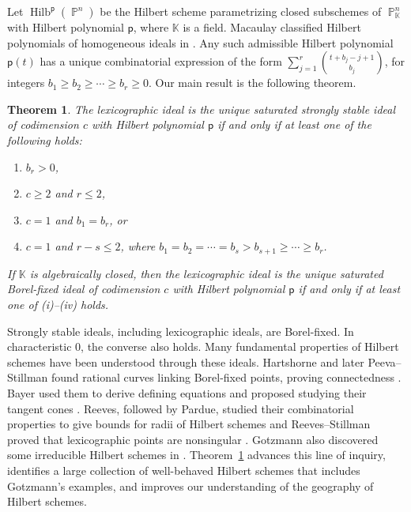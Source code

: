 \documentclass[12pt]{amsart}%
\newtheorem{theorem}{Theorem}[section]
\theoremstyle{definition}%
\DeclareMathOperator{\hilb}{Hilb}%
\DeclareMathOperator{\PP}{\mathbb{P}}%
\newcommand{\hp}{\mathsf{p}}%
\newcommand{\kk}{\mathbb{K}}%
\begin{document}
Let $\hilb^{\hp}(\PP^n)$ be the Hilbert scheme parametrizing closed
subschemes of $\PP^n_{\kk}$ with Hilbert polynomial $\hp$, where $\kk$
is a field.  Macaulay classified Hilbert polynomials of homogeneous
ideals in \cite{Macaulay--1927}.  Any such admissible Hilbert
polynomial $\hp(t)$ has a unique combinatorial expression of the form
$\sum_{j=1}^r \binom{t+b_j-j+1}{b_j}$, for integers $b_1 \ge b_2 \ge
\dotsb \ge b_r \ge 0$.  Our main result is the following theorem.

\begin{theorem}
  \label{thm:SSSunique2intro}
  The lexicographic ideal is the unique saturated strongly stable
  ideal of codimension $c$ with Hilbert polynomial $\hp$ if and only
  if at least one of the following holds:
  \begin{enumerate}
  \item $b_r > 0$,
  \item $c \ge 2$ and $r \le 2$,
  \item $c = 1$ and $b_1 = b_r$, or
  \item $c = 1$ and $r - s \le 2$, where $b_1 = b_2 = \dotsb = b_{s} >
    b_{s+1} \ge \dotsb \ge b_r$.
  \end{enumerate}
  If $\kk$ is algebraically closed, then the lexicographic ideal is
  the unique saturated Borel-fixed ideal of codimension $c$ with
  Hilbert polynomial $\hp$ if and only if at least one of (i)--(iv)
  holds.
\end{theorem}

Strongly stable ideals, including lexicographic ideals, are
Borel-fixed.  In characteristic $0$, the converse also holds.  Many
fundamental properties of Hilbert schemes have been understood through
these ideals.  Hartshorne and later Peeva--Stillman found rational
curves linking Borel-fixed points, proving connectedness
\cite{Hartshorne--1966, Peeva--Stillman--2005}.  Bayer used them to
derive defining equations and proposed studying their tangent cones
\cite{Bayer--1982}.  Reeves, followed by Pardue, studied their
combinatorial properties to give bounds for radii of Hilbert schemes
\cite{Reeves--1995, Pardue--1994} and Reeves--Stillman proved that
lexicographic points are nonsingular \cite{Reeves--Stillman--1997}.
Gotzmann also discovered some irreducible Hilbert schemes in
\cite{Gotzmann--1989}.  Theorem~\ref{thm:SSSunique2intro} advances
this line of inquiry, identifies a large collection of well-behaved
Hilbert schemes that includes Gotzmann's examples, and improves our
understanding of the geography of Hilbert schemes.
\end{document}

